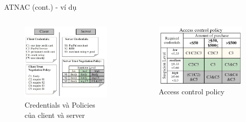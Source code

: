 \documentclass[11pt]{beamer}
\begin{document}
\begin{frame}{ATNAC (cont.) - ví dụ}
\begin{columns}
\begin{column}{0.5\textwidth}
\begin{figure}
    \centering
    \includegraphics[scale=.4]{img/atnac-example-1.png}
    \caption{Credentials và Policies của client và server}
    \label{fig:atnac-1}
\end{figure}
\end{column}
\begin{column}{0.5\textwidth}
\begin{figure}
    \centering
    \includegraphics[scale=.4]{img/atnac-example-2.png}
    \caption{Access control policy}
    \label{fig:atnac-2}
\end{figure}
\end{column}
\end{columns}
\end{frame}
\end{document}
